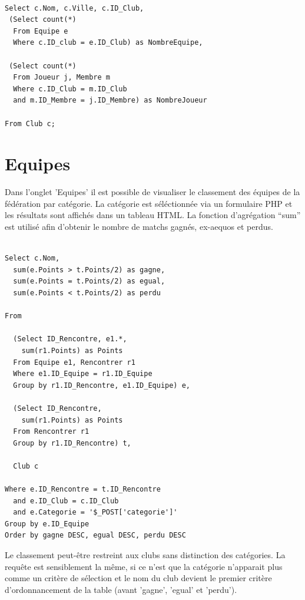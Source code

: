 \documentclass[a4paper»,8pt,french,fleqn]{report}
\begin{document}
\begin{lstlisting}

Select c.Nom, c.Ville, c.ID_Club,
 (Select count(*) 
  From Equipe e
  Where c.ID_club = e.ID_Club) as NombreEquipe,

 (Select count(*) 
  From Joueur j, Membre m
  Where c.ID_Club = m.ID_Club
  and m.ID_Membre = j.ID_Membre) as NombreJoueur

From Club c;
\end{lstlisting}

\section{Equipes}

Dans l'onglet 'Equipes' il est possible de visualiser le classement des équipes de la fédération par catégorie. La catégorie est séléctionnée via un formulaire PHP et les résultats sont affichés dans un tableau HTML. La fonction d'agrégation ``sum'' est utilisé afin d'obtenir le nombre de matchs gagnés, ex-aequos et perdus. 

\begin{lstlisting}

Select c.Nom,
  sum(e.Points > t.Points/2) as gagne,
  sum(e.Points = t.Points/2) as egual,
  sum(e.Points < t.Points/2) as perdu
  
From
  
  (Select ID_Rencontre, e1.*,
    sum(r1.Points) as Points
  From Equipe e1, Rencontrer r1
  Where e1.ID_Equipe = r1.ID_Equipe
  Group by r1.ID_Rencontre, e1.ID_Equipe) e,

  (Select ID_Rencontre,
    sum(r1.Points) as Points
  From Rencontrer r1
  Group by r1.ID_Rencontre) t,
  
  Club c

Where e.ID_Rencontre = t.ID_Rencontre
  and e.ID_Club = c.ID_Club
  and e.Categorie = '$_POST['categorie']'
Group by e.ID_Equipe
Order by gagne DESC, egual DESC, perdu DESC

\end{lstlisting}

Le classement peut-être restreint aux clubs sans distinction des catégories. La requête est sensiblement la même, si ce n'est que la catégorie n'apparait plus comme un critère de sélection et le nom du club devient le premier critère d'ordonnancement de la table (avant 'gagne', 'egual' et 'perdu'). 
\end{document}
